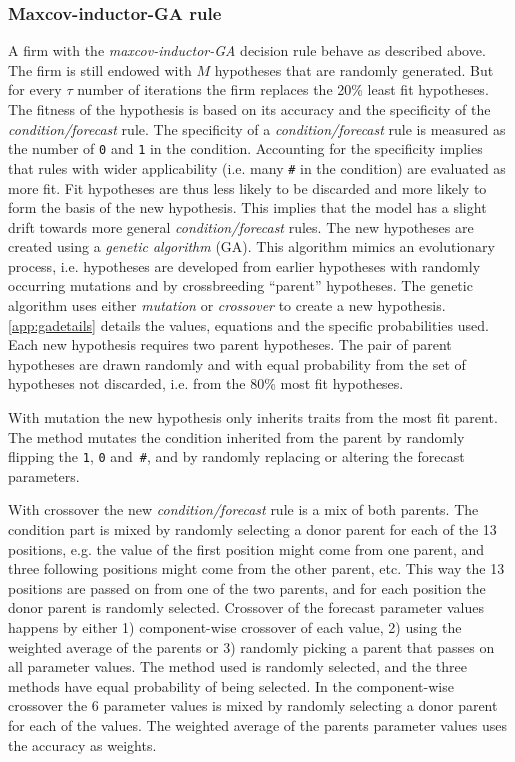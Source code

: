 \documentclass[preprint, 12pt]{elsarticle}
\begin{document}
\subsubsection{Maxcov-inductor-GA rule}

A firm with the \emph{maxcov-inductor-GA} decision rule behave as described above. The firm is still endowed with $M$ hypotheses that are randomly generated. But for every $\tau$ number of iterations the firm replaces the 20\% least fit hypotheses. The fitness of the hypothesis is based on its accuracy and the specificity of the \emph{condition/forecast} rule. The specificity of a \emph{condition/forecast} rule is measured as the number of \texttt{0} and \texttt{1} in the condition. Accounting for the specificity implies that rules with wider applicability (i.e. many \texttt{\#} in the condition) are evaluated as more fit. Fit hypotheses are thus less likely to be discarded and more likely to form the basis of the new hypothesis. This implies that the model has a slight drift towards more general \emph{condition/forecast} rules. The new hypotheses are created using a \emph{genetic algorithm} (GA). This algorithm mimics an evolutionary process, i.e. hypotheses are developed from earlier hypotheses with randomly occurring mutations and by crossbreeding ``parent'' hypotheses. The genetic algorithm uses either \emph{mutation} or \emph{crossover} to create a new hypothesis. \ref{app:gadetails} details the values, equations and the specific probabilities used. Each new hypothesis requires two parent hypotheses. The pair of parent hypotheses are drawn randomly and with equal probability from the set of hypotheses not discarded, i.e. from the 80\% most fit hypotheses. 

With mutation the new hypothesis only inherits traits from the most fit parent. The method mutates the condition inherited from the parent by randomly flipping the \texttt{1}, \texttt{0} and~\texttt{\#}, and by randomly replacing or altering the forecast parameters. 

With crossover the new \emph{condition/forecast} rule is a mix of both parents. The condition part is mixed by randomly selecting a donor parent for each of the 13 positions, e.g. the value of the first position might come from one parent, and three following positions might come from the other parent, etc. This way the 13 positions are passed on from one of the two parents, and for each position the donor parent is randomly selected. Crossover of the forecast parameter values happens by either 1) component-wise crossover of each value, 2) using the weighted average of the parents or 3) randomly picking a parent that passes on all parameter values. The method used is randomly selected, and the three methods have equal probability of being selected. In the component-wise crossover the 6 parameter values is mixed by randomly selecting a donor parent for each of the values. The weighted average of the parents parameter values uses the accuracy as weights.
\end{document}

